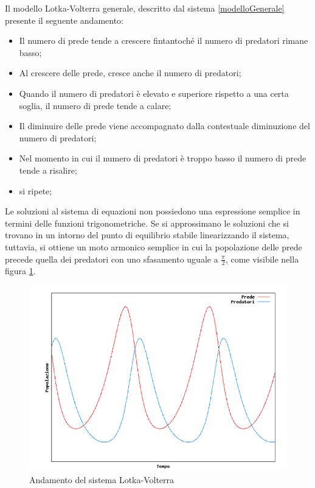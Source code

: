 \documentclass[11pt]{article}
\begin{document}
Il modello Lotka-Volterra generale, descritto dal sistema \ref{modelloGenerale} presente il seguente andamento: 
\begin{itemize}
    \item Il numero di prede tende a crescere fintantoché il numero di predatori rimane basso;
    \item Al crescere delle prede, cresce anche il numero di predatori;
    \item Quando il numero di predatori è elevato e superiore rispetto a una certa soglia, il numero di prede tende a calare;
    \item Il diminuire delle prede viene accompagnato dalla contestuale diminuzione del numero di predatori;
    \item Nel momento in cui il numero di predatori è troppo basso il numero di prede tende a risalire;
    \item si ripete;
\end{itemize}

Le soluzioni al sistema di equazioni non possiedono una espressione semplice in termini delle funzioni trigonometriche. Se si approssimano le soluzioni che si trovano in un intorno del punto di equilibrio stabile linearizzando il sistema, tuttavia, si ottiene un moto armonico semplice in cui la popolazione delle prede precede quella dei predatori con uno sfasamento uguale a $\frac{\pi}{2}$, come visibile nella figura \ref{fig:AndamentoLotkaVolterra}\cite{WikiLotkaVolterra}.

\begin{figure}[h]
    \centering
    \includegraphics[scale = 0.7]{risultatoLotkaVolterra.PNG}
    \caption{Andamento del sistema Lotka-Volterra}
    \label{fig:AndamentoLotkaVolterra}
\end{figure}
\end{document}

